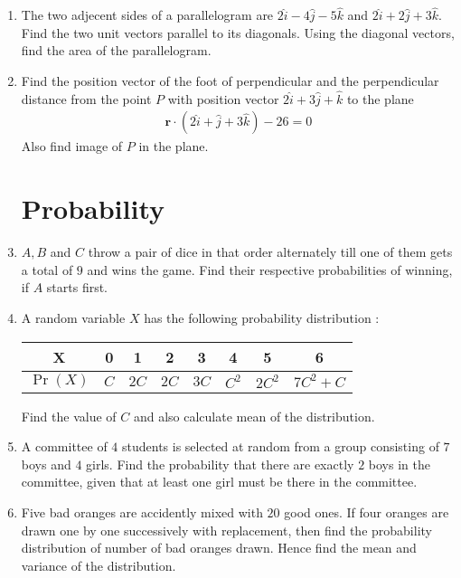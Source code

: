 \documentclass[12pt,-letter paper]{article}
\let\vec\mathbf{}
\let\vec\mathbf{}
\let\vec\mathbf{}
\theoremstyle{remark}
\providecommand{\pr}[1]{\ensuremath{\Pr\left(#1\right)}}
\providecommand{\brak}[1]{\ensuremath{\left(#1\right)}}
\providecommand{\pr}[1]{\ensuremath{\Pr\left(#1\right)}}
\begin{document}
\begin{enumerate}
      \item The two adjecent sides of a parallelogram are $2\hat{i}-4\hat{j}-5\hat{k}$ and $2\hat{i}+2\hat{j}+3\hat{k}$. Find the two unit vectors parallel to its diagonals. Using the diagonal vectors, find the area of the parallelogram.
      \item Find the position vector of the foot of perpendicular and the perpendicular distance from the point $P$ with position vector $2\hat{i}+3\hat{j}+\hat{k}$ to the plane
            \begin{align*}
                  \vec{r}\cdot\brak{2\hat{i}+\hat{j}+3\hat{k}} - 26=0
            \end{align*}
            Also find image of $P$ in the plane.
            \section{Probability}
      \item $A, B$ and $C$ throw a pair of dice in that order alternately till one of them gets a total of $9$ and wins the game. Find their respective probabilities of winning, if $A$ starts first.
      \item A random variable $X$ has the following probability distribution :
            \begin{table}[h!]
                  \begin{center}
                        \begin{tabular}{|c |c| c | c | c | c | c | c |}
                              \hline
                              X        & 0   & 1    & 2    & 3    & 4     & 5      & 6         \\
                              \hline
                              $\pr{X}$ & $C$ & $2C$ & $2C$ & $3C$ & $C^2$ & $2C^2$ & $7C^2 +C$ \\
                              \hline
                        \end{tabular}
                  \end{center}
            \end{table}
            Find the value of $C$ and also calculate mean of the distribution.
      \item A committee of $4$ students is selected at random from a group consisting of $7$ boys and $4$ girls. Find the probability that there are exactly $2$ boys in the committee, given that at least one girl must be there in the committee.
      \item Five bad oranges are accidently mixed with $20$ good ones. If four oranges are drawn one by one successively with replacement, then find the probability distribution of number of bad oranges drawn. Hence find the mean and variance of the distribution.

\end{enumerate}
\end{document}
